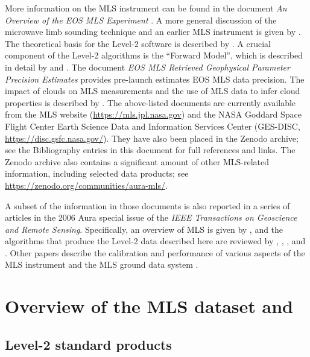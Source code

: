 

More information on the MLS instrument can be found in the document \emph{An Overview of the EOS MLS Experiment} \citep{EOSMLSOverview}. A more general discussion of the microwave limb sounding technique and an earlier MLS instrument is given by \citet{WatersEtal:1999}. The theoretical basis for the \mbox{Level-2} software is described by \citet{EOSMLSL2ATBD}. A crucial component of the \mbox{Level-2} algorithms is the ``Forward Model'', which is described in detail by \citet{EOSMLSFWMATBD} and \citet{EOSMLSPolarizedFWMATBD}. The document \emph{EOS MLS Retrieved Geophysical Parameter Precision Estimates} \citep{EOSMLSPrecision} provides pre-launch estimates EOS MLS data precision. The impact of clouds on MLS measurements and the use of MLS data to infer cloud properties is described by \cite{EOSMLSCloudATBD}. The above-listed documents are currently available from the MLS website (\url{https://mls.jpl.nasa.gov}) and the NASA Goddard Space Flight Center Earth Science Data and Information Services Center (GES-DISC, \url{https://disc.gsfc.nasa.gov/}).  They have also been placed in the Zenodo archive; see the Bibliography entries in this document for full references and links.  The Zenodo archive also contains a significant amount of other MLS-related information, including selected data products; see \url{https://zenodo.org/communities/aura-mls/}.

A subset of the information in those documents is also reported in a series of articles in the 2006 Aura special issue of the \emph{IEEE Transactions on Geoscience and Remote Sensing}. Specifically, an overview of MLS is given by \citet{WatersEtal:2006}, and the algorithms that produce the \mbox{Level-2} data described here are reviewed by \citet{LiveseyEtal:2006}, \citet{ReadEtal:2006}, \citet{SchwartzEtal:2006}, and \citet{WuEtal:2006}\@. Other papers describe the calibration and performance of various aspects of the MLS instrument \citep{JarnotEtal:2006, Pickett:2006, CofieldEtal:2006} and the MLS ground data system \citep{CuddyEtal:2006}. 

\section{Overview of the MLS dataset and \thisv}

\subsection{Level-2 standard products}

